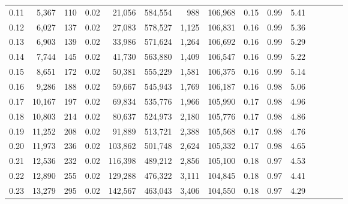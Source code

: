 \begin{tabular}{rrrcrrrrrrrrrrr}
0.11 &   5,367 &    110 &                                       0.02 &   21,056 &  584,554 &      988 &  106,968 &  0.15 &  0.99 &                         5.41 \\
0.12 &   6,027 &    137 &                                       0.02 &   27,083 &  578,527 &    1,125 &  106,831 &  0.16 &  0.99 &                         5.36 \\
0.13 &   6,903 &    139 &                                       0.02 &   33,986 &  571,624 &    1,264 &  106,692 &  0.16 &  0.99 &                         5.29 \\
0.14 &   7,744 &    145 &                                       0.02 &   41,730 &  563,880 &    1,409 &  106,547 &  0.16 &  0.99 &                         5.22 \\
0.15 &   8,651 &    172 &                                       0.02 &   50,381 &  555,229 &    1,581 &  106,375 &  0.16 &  0.99 &                         5.14 \\
0.16 &   9,286 &    188 &                                       0.02 &   59,667 &  545,943 &    1,769 &  106,187 &  0.16 &  0.98 &                         5.06 \\
0.17 &  10,167 &    197 &                                       0.02 &   69,834 &  535,776 &    1,966 &  105,990 &  0.17 &  0.98 &                         4.96 \\
0.18 &  10,803 &    214 &                                       0.02 &   80,637 &  524,973 &    2,180 &  105,776 &  0.17 &  0.98 &                         4.86 \\
0.19 &  11,252 &    208 &                                       0.02 &   91,889 &  513,721 &    2,388 &  105,568 &  0.17 &  0.98 &                         4.76 \\
0.20 &  11,973 &    236 &                                       0.02 &  103,862 &  501,748 &    2,624 &  105,332 &  0.17 &  0.98 &                         4.65 \\
0.21 &  12,536 &    232 &                                       0.02 &  116,398 &  489,212 &    2,856 &  105,100 &  0.18 &  0.97 &                         4.53 \\
0.22 &  12,890 &    255 &                                       0.02 &  129,288 &  476,322 &    3,111 &  104,845 &  0.18 &  0.97 &                         4.41 \\
0.23 &  13,279 &    295 &                                       0.02 &  142,567 &  463,043 &    3,406 &  104,550 &  0.18 &  0.97 &                         4.29 \\

\end{tabular}
